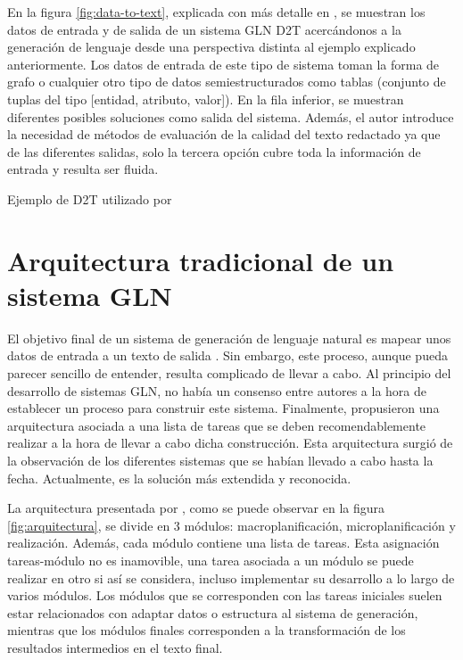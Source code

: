 En la figura \ref{fig:data-to-text}, explicada con más detalle en \cite{sai2020survey}, se muestran los datos de entrada y de salida de un sistema GLN D2T acercándonos a la generación de lenguaje desde una perspectiva distinta al ejemplo explicado anteriormente.  Los datos de entrada de este tipo de sistema toman la forma de grafo o cualquier otro tipo de datos semiestructurados como tablas (conjunto de tuplas del tipo [entidad, atributo, valor]). En la fila inferior, se muestran diferentes posibles soluciones como salida del sistema. Además, el autor introduce la necesidad de métodos de evaluación de la calidad del texto redactado ya que de las diferentes salidas, solo la tercera opción cubre toda la información de entrada y resulta ser fluida.

%
{Ejemplo de D2T utilizado por \cite{sai2020survey}}

\section{Arquitectura tradicional de un sistema GLN}
\label{sec:arquitectura_tradicional}
El objetivo final de un sistema de generación de lenguaje natural es mapear unos datos de entrada a un texto de salida \citep{reiter1997building}. Sin embargo, este proceso, aunque pueda parecer sencillo de entender, resulta complicado de llevar a cabo. Al principio del desarrollo de sistemas GLN, no había un consenso entre autores a la hora de establecer un proceso para construir este sistema. Finalmente, \cite{reiter1997building} propusieron una arquitectura asociada a una lista de tareas que se deben recomendablemente realizar a la hora de llevar a cabo dicha construcción. Esta arquitectura surgió de la observación de los diferentes sistemas que se habían llevado a cabo hasta la fecha.  Actualmente, es la solución más extendida y reconocida.

La arquitectura presentada por \cite{reiter1997building}, como se puede observar en la figura \ref{fig:arquitectura}, se divide en 3 módulos: macroplanificación, microplanificación y realización. Además, cada módulo contiene una lista de tareas. Esta asignación tareas-módulo no es inamovible, una tarea asociada a un módulo se puede realizar en otro si así se considera, incluso implementar su desarrollo a lo largo de varios módulos. Los módulos que se corresponden con las tareas iniciales suelen estar relacionados con adaptar datos o estructura al sistema de generación, mientras que los módulos finales corresponden a la transformación de los resultados intermedios en el texto final.

